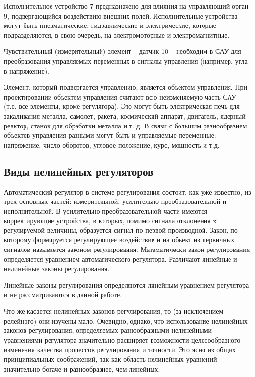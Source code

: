 Исполнительное устройство 7 предназначено для влияния на управляющий орган 9, подвергающийся воздействию внешних полей. Исполнительные устройства могут быть пневматические, гидравлические и электрические, которые подразделяются, в свою очередь, на электромоторные и электромагнитные.

Чувствительный (измерительный) элемент – датчик 10 – необходим в САУ для преобразования управляемых переменных в сигналы управления (например, угла в напряжение).

Элемент, который подвергается управлению, является объектом управления. При проектировании объектом управления считают всю неизменяемую часть САУ (т.е. все элементы, кроме регулятора). Это могут быть электрическая печь для закаливания металла, самолет, ракета, космический аппарат, двигатель, ядерный реактор, станок для обработки металла и т. д. В связи с большим разнообразием объектов управления разными могут быть и управляемые переменные: напряжение, число оборотов, угловое положение, курс, мощность и т.д.

\subsection{Виды нелинейных регуляторов}
\label{sub:domain:2}

Автоматический регулятор в системе регулирования состоит, как уже известно, из трех основных частей: измерительной, усилительно-преобразовательной и исполнительной. В усилительно-преобразовательной части имеются корректирующие устройства, в которых, помимо сигнала отклонения x регулируемой величины, образуется сигнал по первой производной. Закон, по которому формируется регулирующее воздействие и на объект из первичных сигналов называется законом регулирования. Математически закон регулирования определяется уравнением автоматического регулятора. Различают линейные и нелинейные законы регулирования.

Линейные законы регулирования определяются линейным уравнением регулятора и не рассматриваются в данной работе.

Что же касается нелинейных законов регулирования, то (за исключением релейного) они изучены мало. Очевидно, однако, что использование нелинейных законов регулирования, определяемых разнообразными нелинейными уравнениями регулятора значительно расширяет возможности целесообразного изменения качества процессов регулирования и точности. Это ясно из общих принципиальных соображений, так как область нелинейных уравнений значительно богаче и разнообразнее, чем линейных.


